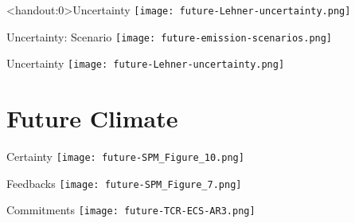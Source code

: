 \begin{frame}<handout:0>{Uncertainty}
    \centering
    \texttt{[image: future-Lehner-uncertainty.png]}
\end{frame}

\begin{frame}{Uncertainty: Scenario}
    \centering
    \texttt{[image: future-emission-scenarios.png]}
\end{frame}

\begin{frame}{Uncertainty}
    \centering
    \texttt{[image: future-Lehner-uncertainty.png]}


\end{frame}

\section{Future Climate}

\begin{frame}{Certainty}
    \centering
    \texttt{[image: future-SPM\_Figure\_10.png]}
\end{frame}

\begin{frame}{Feedbacks}
    \centering
    \texttt{[image: future-SPM\_Figure\_7.png]}
\end{frame}

\begin{frame}{Commitments}
    \centering
    \texttt{[image: future-TCR-ECS-AR3.png]}
\end{frame}

